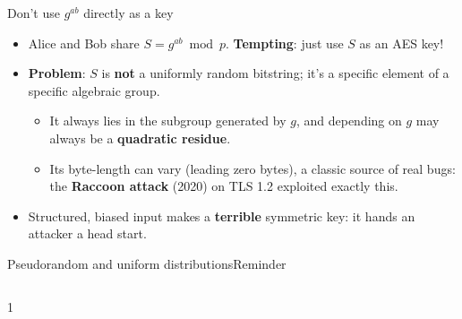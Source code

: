 \ifdefined\PRESENTATION\else\PassOptionsToClass{handout}{beamer}\fi\documentclass[aspectratio=169, lualatex]{beamer}
\begin{document}
\begin{frame}{Don't use $g^{ab}$ directly as a key}
	\begin{itemize}[<+->]
		\item Alice and Bob share $S = g^{ab} \bmod p$. \textbf{Tempting}: just use $S$ as an AES key!
		\item \textbf{Problem}: $S$ is \textbf{not} a uniformly random bitstring; it's a specific element of a specific algebraic group.
		      \begin{itemize}
			      \item It always lies in the subgroup generated by $g$, and depending on $g$ may always be a \textbf{quadratic residue}.
			      \item Its byte-length can vary (leading zero bytes), a classic source of real bugs: the \textbf{Raccoon attack} (2020) on TLS 1.2 exploited exactly this.
		      \end{itemize}
		\item Structured, biased input makes a \textbf{terrible} symmetric key: it hands an attacker a head start.
	\end{itemize}
\end{frame}

\begin{frame}{Pseudorandom and uniform distributions}{Reminder}
	\begin{columns}[c]
		\begin{column}{1\textwidth}
		\end{column}
	\end{columns}
\end{frame}
\end{document}
